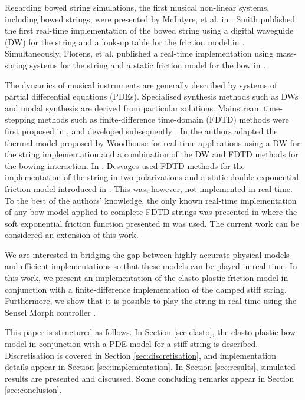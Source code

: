\documentclass[twoside,a4paper,dvipsnames]{article}
\begin{document}
Regarding bowed string simulations, the first musical non-linear systems, including bowed strings, were presented by McIntyre, et al. in \cite{McIntyre1983}. Smith published the first real-time implementation of the bowed string using a digital waveguide (DW) for the string and a look-up table for the friction model in \cite{Smith1986}. Simultaneously, Florens, et al. published a real-time implementation using mass-spring systems for the string and a static friction model for the bow in \cite{Florens1986}. 

The dynamics of musical instruments are generally described by systems of  partial differential equations (PDEs). Specialised synthesis methods such as DWs \cite{Smith1992} and modal synthesis \cite{Morrison1993} are derived from particular solutions.  Mainstream time-stepping methods such as finite-difference time-domain (FDTD) methods were first proposed in \cite{Hiller, Hiller2, Chaigne}, and developed subsequently \cite{Bilbao2009, Bilbao2018}. In \cite{Maestre2014} the authors adapted the thermal model proposed by Woodhouse \cite{Woodhouse2003} for real-time applications using a DW for the string implementation and a combination of the DW and FDTD methods for the bowing interaction. In \cite{Desvages2017, Desvages2015}, Desvages used FDTD methods for the implementation of the string in two polarizations and a static double exponential friction model introduced in \cite{Smith2000}. This was, however, not implemented in real-time. To the best of the authors' knowledge, the only known real-time implementation of any bow model applied to complete FDTD strings was presented in \cite{Willemsen2019} where the soft exponential friction function presented in \cite{Bilbao2009} was used. The current work can be considered an extension of this work.

We are interested in bridging the gap between highly accurate physical models and efficient implementations so that these models can be played in real-time. In this work, we present an implementation of the elasto-plastic friction model in conjunction with a finite-difference implementation of the damped stiff string. Furthermore, we show that it is possible to play the string in real-time using the Sensel Morph controller \cite{Sensel2019}.

This paper is structured as follows. In Section \ref{sec:elasto}, the elasto-plastic bow model in conjunction with a PDE model for a stiff string is described. Discretisation is covered in Section \ref{sec:discretisation}, and implementation details appear in Section \ref{sec:implementation}. In Section \ref{sec:results}, simulated results are presented and discussed. Some concluding remarks appear in Section  \ref{sec:conclusion}.
\end{document}
